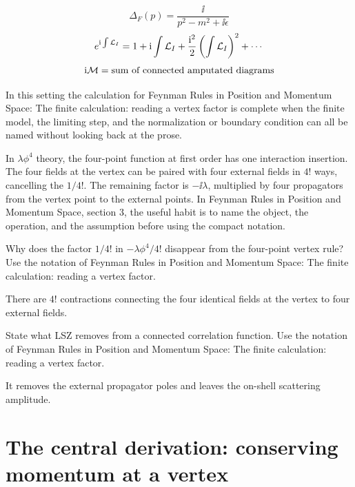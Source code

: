 \[
  \Delta_F(p)=\frac{\ii}{p^2-m^2+\ii\epsilon}
\]
\[
  e^{\mathrm i\int\mathcal L_I}=1+\mathrm i\int\mathcal L_I+\frac{\mathrm i^2}{2}\left(\int\mathcal L_I\right)^2+\cdots
\]
\[
  \mathrm i\mathcal M=\hbox{sum of connected amputated diagrams}
\]

In this setting the calculation for Feynman Rules in Position and Momentum Space: The finite calculation: reading a vertex factor is complete when the finite model, the limiting step, and the normalization or boundary condition can all be named without looking back at the prose.




\begin{example}
In \(\lambda\phi^4\) theory, the four-point function at first order has one interaction insertion.  The four fields at the vertex can be paired with four external fields in \(4!\) ways, cancelling the \(1/4!\).  The remaining factor is \(-\ii\lambda\), multiplied by four propagators from the vertex point to the external points.  In Feynman Rules in Position and Momentum Space, section 3, the useful habit is to name the object, the operation, and the assumption before using the compact notation.
\end{example}



\begin{exercise}
Why does the factor \(1/4!\) in \(-\lambda\phi^4/4!\) disappear from the four-point vertex rule?  Use the notation of Feynman Rules in Position and Momentum Space: The finite calculation: reading a vertex factor.
\begin{answer}
There are \(4!\) contractions connecting the four identical fields at the vertex to four external fields.
\end{answer}
\end{exercise}

\begin{exercise}
State what LSZ removes from a connected correlation function.  Use the notation of Feynman Rules in Position and Momentum Space: The finite calculation: reading a vertex factor.
\begin{answer}
It removes the external propagator poles and leaves the on-shell scattering amplitude.
\end{answer}
\end{exercise}



\section{The central derivation: conserving momentum at a vertex}

